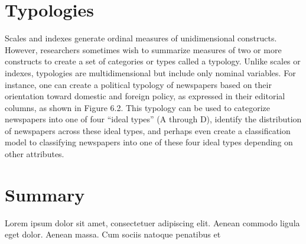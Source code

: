 \section{Typologies}

Scales and indexes generate ordinal measures of unidimensional constructs. However, researchers sometimes wish to summarize measures of two or more constructs to create a set of categories or types called a typology. Unlike scales or indexes, typologies are multidimensional but include only nominal variables. For instance, one can create a political typology of newspapers based on their orientation toward domestic and foreign policy, as expressed in their editorial columns, as shown in Figure 6.2. This typology can be used to categorize newspapers into one of four ``ideal types'' (A through D), identify the distribution of newspapers across these ideal types, and perhaps even create a classification model to classifying newspapers into one of these four ideal types depending on other attributes.

\section{Summary}\label{ch05:summary}

Lorem ipsum dolor sit amet, consectetuer adipiscing elit. Aenean commodo ligula eget dolor. Aenean massa. Cum sociis natoque penatibus et
